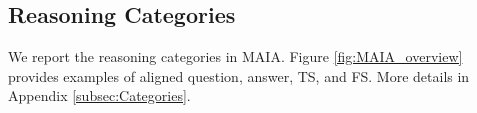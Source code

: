      


\subsection{Reasoning Categories}
\label{sec:semcat}
We report  the reasoning categories  in MAIA. Figure \ref{fig:MAIA_overview} provides  examples of aligned question, answer, TS, and FS. More  details in Appendix \ref{subsec:Categories}. 

